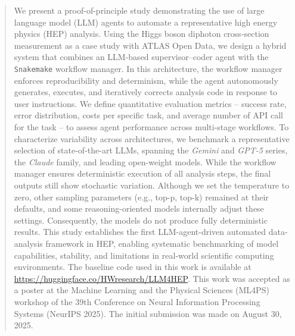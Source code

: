 \documentclass[aps,prd,reprint,superscriptaddress]{revtex4-2}
\begin{document}
\begin{abstract}
We present a proof-of-principle study demonstrating the use of large language model (LLM) agents to automate a representative high energy physics (HEP) analysis. Using the Higgs boson diphoton cross-section measurement as a case study with ATLAS Open Data, we design a hybrid system that combines an LLM-based supervisor–coder agent with the \texttt{Snakemake} workflow manager. In this architecture, the workflow manager enforces reproducibility and determinism, while the agent autonomously generates, executes, and iteratively corrects analysis code in response to user instructions. We define quantitative evaluation metrics -- success rate, error distribution, costs per specific task, and average number of API call for the task -- to assess agent performance across multi-stage workflows. To characterize variability across architectures, we benchmark a representative selection of state-of-the-art LLMs, spanning the \textit{Gemini} and \textit{GPT-5} series, the \textit{Claude} family, and leading open-weight models.  While the workflow manager ensures deterministic execution of all analysis steps, the final outputs still show stochastic variation. Although we set the temperature to zero, other sampling parameters (e.g., top-p, top-k) remained at their defaults, and some reasoning-oriented models internally adjust these settings. Consequently, the models do not produce fully deterministic results. This study establishes the first LLM-agent-driven automated data-analysis framework in HEP, enabling systematic benchmarking of model capabilities, stability, and limitations in real-world scientific computing environments. The baseline code used in this work is available at \href{https://huggingface.co/HWresearch/LLM4HEP}{https://huggingface.co/HWresearch/LLM4HEP}. This work was accepted as a poster at the Machine Learning and the Physical Sciences (ML4PS) workshop of the 39th Conference on Neural Information Processing Systems (NeurIPS 2025). The initial submission was made on August 30, 2025.
\end{abstract}
\maketitle
\end{document}
